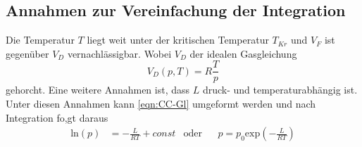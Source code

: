 
\subsection{Annahmen zur Vereinfachung der Integration} %
\label{sub:Vereinfachung}
Die Temperatur $T$ liegt weit unter der kritischen Temperatur $T_{Kr}$ und $V_F$ ist gegenüber $V_D$ vernachlässigbar.
Wobei $V_D$ der idealen Gasgleichung
\begin{equation*}
    V_D(p,T) = R\frac{T}{p}
\end{equation*}
gehorcht.
Eine weitere Annahmen ist, dass $L$ druck- und temperaturabhängig ist. 
Unter diesen Annahmen kann \autoref{eqn:CC-Gl} umgeformt werden und nach Integration fo,gt daraus
\begin{align}
    \text{ln}(p) &= -\frac{L}{RT}+const &\text{oder} && p=p_0 \text{exp}(-\frac{L}{RT})
    \label{eqn:CC-Gl_2}
\end{align}
 